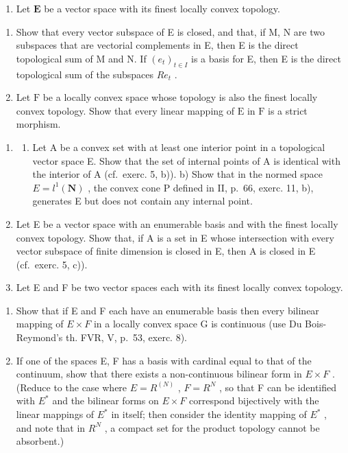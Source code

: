 \begin{enumerate}
\def\labelenumi{\arabic{enumi})}
\setcounter{enumi}{5}
\tightlist
\item
  Let \(\mathbf{E}\) be a vector space with its finest locally convex topology.
\end{enumerate}

\begin{enumerate}
\def\labelenumi{\alph{enumi})}
\item
  Show that every vector subspace of E is closed, and that, if M, N are two subspaces that are vectorial complements in E, then E is the direct topological sum of M and N. If \((e_{t})_{t\in I}\) is a basis for E, then E is the direct topological sum of the subspaces \(Re_{t}\) .
\item
  Let \(\mathrm{F}\) be a locally convex space whose topology is also the finest locally convex topology. Show that every linear mapping of \(\mathrm{E}\) in \(\mathrm{F}\) is a strict morphism.
\end{enumerate}

\begin{enumerate}
\def\labelenumi{\arabic{enumi})}
\setcounter{enumi}{6}
\item
  \begin{enumerate}
  \def\labelenumii{\alph{enumii})}
  \tightlist
  \item
    Let A be a convex set with at least one interior point in a topological vector space E. Show that the set of internal points of A is identical with the interior of A (cf.~exerc. 5, b)). b) Show that in the normed space \(E = l^{1}(\mathbf{N})\) , the convex cone P defined in II, p.~66, exerc. 11, b), generates E but does not contain any internal point.
  \end{enumerate}
\item
  Let E be a vector space with an enumerable basis and with the finest locally convex topology. Show that, if A is a set in E whose intersection with every vector subspace of finite dimension is closed in E, then A is closed in E (cf.~exerc. 5, c)).
\item
  Let E and F be two vector spaces each with its finest locally convex topology.
\end{enumerate}

\begin{enumerate}
\def\labelenumi{\alph{enumi})}
\item
  Show that if E and F each have an enumerable basis then every bilinear mapping of \(E \times F\) in a locally convex space G is continuous (use Du Bois-Reymond's th. FVR, V, p.~53, exerc. 8).
\item
  If one of the spaces E, F has a basis with cardinal equal to that of the continuum, show that there exists a non-continuous bilinear form in \(E \times F\) . (Reduce to the case where \(E = R^{(N)}\) , \(F = R^{N}\) , so that F can be identified with \(E^{*}\) and the bilinear forms on \(E \times F\) correspond bijectively with the linear mappings of \(E^{*}\) in itself; then consider the identity mapping of \(E^{*}\) , and note that in \(R^{N}\) , a compact set for the product topology cannot be absorbent.)
\end{enumerate}

